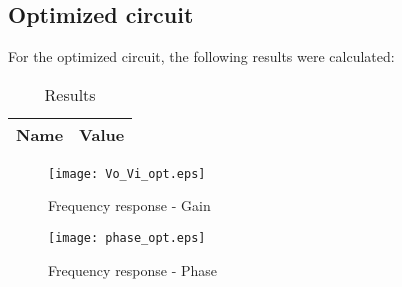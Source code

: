 \subsection{Optimized circuit}

For the optimized circuit, the following results were calculated:

\begin{table}[H]
  \centering
  \begin{tabular}{|c|c|}
    \hline
        {\bf Name} & {\bf Value} \\
        \hline
        \hline
        
        \hline
  \end{tabular}
  \caption{Results}
  \label{teo_results}
\end{table}

\begin{figure}[H]
        \centering
        \texttt{[image: Vo\_Vi\_opt.eps]}
        \caption{Frequency response - Gain}
        \label{tfrg}
\end{figure}

\begin{figure}[H]
        \centering
        \texttt{[image: phase\_opt.eps]}
        \caption{Frequency response - Phase}
        \label{tfrf}
\end{figure}
